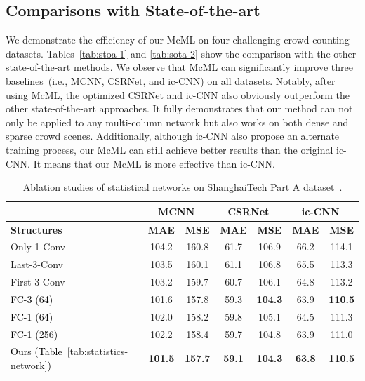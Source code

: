 \documentclass[sigconf]{acmart}
\newcommand{\ljx}[1]{\textcolor{black}{#1}}
\begin{document}
\vspace{-2mm}
\subsection{Comparisons with State-of-the-art}
\label{sec:compare-with-sota}
We demonstrate the efficiency of our McML on four challenging crowd counting datasets.
Tables~\ref{tab:stoa-1} and \ref{tab:sota-2} show the comparison with the other state-of-the-art methods.
We observe that McML can significantly improve three baselines~(i.e., MCNN, CSRNet, and ic-CNN) on all datasets. 
Notably, after using McML, the optimized CSRNet and ic-CNN also obviously outperform the other state-of-the-art approaches.
It fully demonstrates that our method can not only be applied to any \ljx{m}ulti-column network but also works on both dense and sparse crowd scenes.
Additionally, although ic-CNN also propose an alternate training process, our McML can still achieve better results than the original ic-CNN. 
It means that our McML is more effective than ic-CNN.

\begin{table}[!t]
\small
\renewcommand\arraystretch{0.9}
\caption{\small Ablation studies of statistical networks on ShanghaiTech Part A dataset~\cite{MCNN-16}.}
\label{tab:ablation-statistical-network}
\vspace{-2mm}
\setlength\tabcolsep{4pt}
\begin{tabular}{|l|c|c|c|c|c|c|}
\hline
 & \multicolumn{2}{c|}{\textbf{MCNN~\cite{MCNN-16}}} & \multicolumn{2}{c|}{\textbf{CSRNet~\cite{CSRNet-18}}} & \multicolumn{2}{c|}{\textbf{ic-CNN~\cite{deep-training-ICCNN-18}}} \\ \hline
\textbf{Structures} & \textbf{MAE}     & \textbf{MSE}    & \textbf{MAE}      & \textbf{MSE}     & \textbf{MAE}      & \textbf{MSE}     \\ \hline \hline
Only-1-Conv    & 104.2          & 160.8          & 61.7          & 106.9          & 66.2          & 114.1           \\
Last-3-Conv    & 103.5          & 160.1          & 61.1          & 106.8          & 65.5          & 113.3           \\
First-3-Conv   & 103.2          & 159.7          & 60.7          & 106.1          & 64.8          & 113.2           \\
\ljx{FC-3 (64)}      & 101.6          & 157.8          & 59.3          & \textbf{104.3} & 63.9          & \textbf{110.5}  \\
\ljx{FC-1 (64)}    & 102.0          & 158.2          & 59.8          & 105.1   & 64.5          & 111.3           \\
\ljx{FC-1 (256)}          & 102.2          & 158.4          & 59.7          & 104.8          & 63.9          & 111.0 \\
\ljx{Ours (Table~\ref{tab:statistics-network})}        & \textbf{101.5} & \textbf{157.7} & \textbf{59.1} & \textbf{104.3} & \textbf{63.8} & \textbf{110.5} \\
\hline
\end{tabular}
\end{table}
\end{document}
